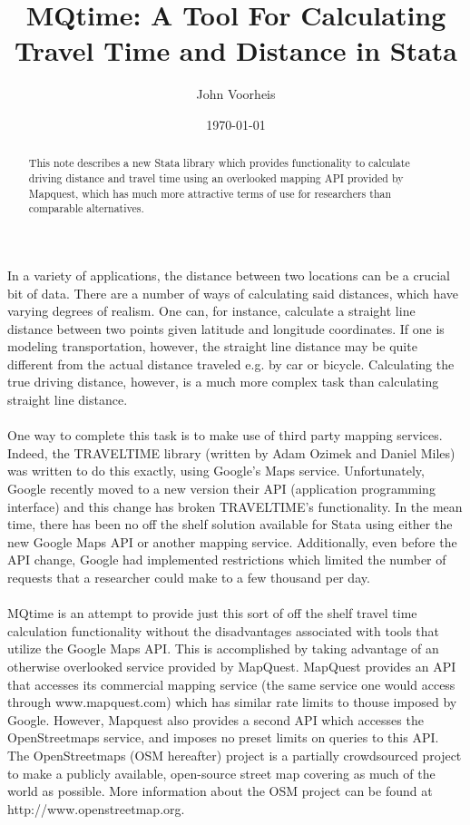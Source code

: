 \documentclass[12pt]{article}
\title{MQtime: A Tool For Calculating Travel Time and Distance in Stata}
\author{John Voorheis}
\date{\today}
\begin{document}
\maketitle

\begin{abstract}
This note describes a new Stata library which provides functionality to calculate driving distance and travel time using an overlooked  mapping API provided by Mapquest, which has much more attractive terms of use for researchers than comparable alternatives. 
\end{abstract}

In a variety of applications, the distance between two locations can be a crucial bit of data. There are a number of ways of calculating said distances, which have varying degrees of realism. One can, for instance, calculate a straight line distance between two points given latitude and longitude coordinates. If one is modeling transportation, however, the straight line distance may be quite different from the actual distance traveled e.g. by car or bicycle. Calculating the true driving distance, however, is a much more complex task than calculating straight line distance. 
\\ \\
One way to complete this task is to make use of third party mapping services. Indeed, the TRAVELTIME library (written by Adam Ozimek and Daniel Miles) was written to do this exactly, using Google's Maps service. Unfortunately, Google recently moved to a new version their API (application programming interface) and this change has broken TRAVELTIME's functionality. In the mean time, there has been no off the shelf solution available for Stata using either the new Google Maps API or another mapping service. Additionally, even before the API change, Google had implemented restrictions which limited the number of requests that a researcher could make to a few thousand per day.
\\ \\
MQtime is an attempt to provide just this sort of off the shelf travel time calculation functionality without the disadvantages associated with tools that utilize the Google Maps API. This is accomplished by taking advantage of an otherwise overlooked service provided by MapQuest. MapQuest provides an API that accesses its commercial mapping service (the same service one would access through www.mapquest.com) which has similar rate limits to thouse imposed by Google. However, Mapquest also provides a second API which accesses the OpenStreetmaps service, and imposes no preset limits on queries to this API. The OpenStreetmaps (OSM hereafter) project is a partially crowdsourced project to make a publicly available, open-source street map covering as much of the world as possible. More information about the OSM project can be found at 
http://www.openstreetmap.org. 
\\ \\
\end{document}
